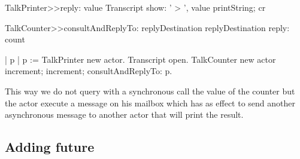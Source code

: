 \documentclass[a4paper,10pt,twoside]{book}
\begin{document}
\begin{method}{}
TalkPrinter>>reply: value
	Transcript show: ' > ', value printString; cr  
\end{method}

\begin{method}{}
TalkCounter>>consultAndReplyTo: replyDestination
	replyDestination reply: count
\end{method}


\begin{code}{}
| p |
	p := TalkPrinter new actor. 
	Transcript open.
	TalkCounter new actor
		increment; increment; consultAndReplyTo: p.
\end{code}

This way we do not query with a synchronous call the value of the counter
but the actor execute a message on his mailbox which has as effect to 
send another asynchronous message to another actor that will print the result. 
	
\subsection{Adding future}


\ifx\wholebook\relax\else
\end{document}
